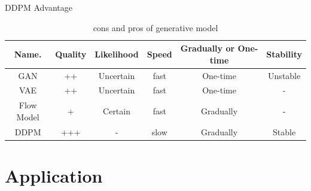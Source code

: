\documentclass[aspectratio=169]{beamer}
\begin{document}
\begin{frame}{DDPM Advantage}
    \begin{table}
        \begin{tabular}{| c || c | c | c | c | c |  }
            \hline
            Name.      & Quality & Likelihood & Speed & Gradually or One-time & Stability \\
            \hline \hline
            GAN        & ++      & Uncertain  & fast  & One-time              & Unstable  \\
            VAE        & ++      & Uncertain  & fast  & One-time              & -         \\
            Flow Model & +       & Certain    & fast  & Gradually             & -         \\
            DDPM       & +++     & -          & slow  & Gradually             & Stable    \\
            \hline
        \end{tabular}
        \caption{cons and pros of generative model}
    \end{table}
\end{frame}

\section{Application}
\end{document}
